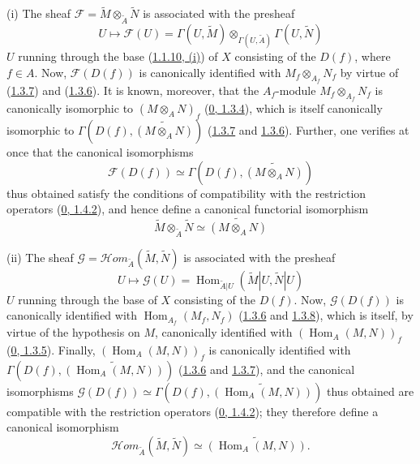 (i) The sheaf
$\mathscr{F}=\widetilde{M}\otimes_{\widetilde{A}}\widetilde{N}$ is
associated with the presheaf
\[
  U\mapsto\mathscr{F}(U)=\Gamma(U,\widetilde{M})
  \otimes_{\Gamma(U,\widetilde{A})}\Gamma(U,\widetilde{N})
\]
$U$ running through the base (\hyperref[I.1.1.10]{1.1.10, (i)}) of $X$
consisting of the $D(f)$, where $f\in A$. Now, $\mathscr{F}(D(f))$ is
canonically identified with $M_f\otimes_{A_f}N_f$ by virtue of
(\hyperref[I.1.3.7]{1.3.7}) and (\hyperref[I.1.3.6]{1.3.6}). It is
known, moreover, that the $A_f$-module $M_f\otimes_{A_f}N_f$ is canonically
isomorphic to $(M\otimes_A N)_f$ (\hyperref[0.1.3.4]{0, 1.3.4}), which is
itself canonically isomorphic to
$\Gamma(D(f),\widetilde{(M\otimes_A N)})$
(\hyperref[I.1.3.7]{1.3.7} and \hyperref[I.1.3.6]{1.3.6}). Further,
one verifies at once that the canonical isomorphisms
\[
  \mathscr{F}(D(f))\simeq\Gamma(D(f),\widetilde{(M\otimes_A N)})
\]
thus obtained satisfy the conditions of compatibility with the restriction
operators (\hyperref[0.1.4.2]{0, 1.4.2}), and hence define a canonical
functorial isomorphism
\[
  \widetilde{M}\otimes_{\widetilde{A}}\widetilde{N}
  \simeq\widetilde{(M\otimes_A N)}
\]

(ii) The sheaf
$\mathscr{G}=\mathscr{H}\!om_{\widetilde{A}}(\widetilde{M},\widetilde{N})$
is associated with the presheaf
\[
  U\longmapsto\mathscr{G}(U)
  =\operatorname{Hom}_{\widetilde{A}|U}
  (\widetilde{M}|U,\widetilde{N}|U)
\]
$U$ running through the base of $X$ consisting of the $D(f)$. Now,
$\mathscr{G}(D(f))$ is canonically identified with
$\operatorname{Hom}_{A_f}(M_f,N_f)$
(\hyperref[I.1.3.6]{1.3.6} and \hyperref[I.1.3.8]{1.3.8}), which
is itself, by virtue of the hypothesis on $M$, canonically identified with
$(\operatorname{Hom}_A(M,N))_f$
(\hyperref[0.1.3.5]{0, 1.3.5}). Finally,
$(\operatorname{Hom}_A(M,N))_f$ is canonically identified with
$\Gamma(D(f),\widetilde{(\operatorname{Hom}_A(M,N))})$
(\hyperref[I.1.3.6]{1.3.6} and \hyperref[I.1.3.7]{1.3.7}), and the
canonical isomorphisms
$\mathscr{G}(D(f))\simeq
\Gamma(D(f),\widetilde{(\operatorname{Hom}_A(M,N))})$ thus obtained are
compatible with the restriction operators
(\hyperref[0.1.4.2]{0, 1.4.2}); they therefore define a canonical
isomorphism
\[
  \mathscr{H}\!om_{\widetilde{A}}(\widetilde{M},\widetilde{N})
  \simeq\widetilde{(\operatorname{Hom}_A(M,N))}.
\]

